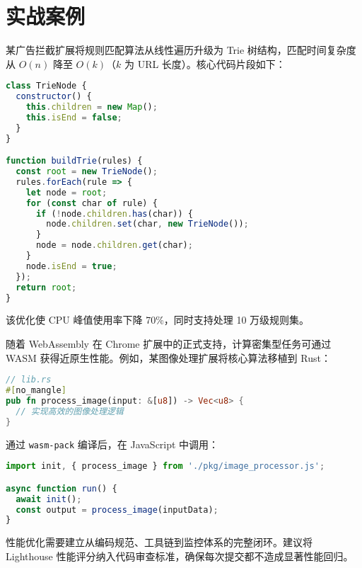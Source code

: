 \chapter{实战案例}
某广告拦截扩展将规则匹配算法从线性遍历升级为 Trie 树结构，匹配时间复杂度从 $O(n)$ 降至 $O(k)$（$k$ 为 URL 长度）。核心代码片段如下：\par
\begin{lstlisting}[language=javascript]
class TrieNode {
  constructor() {
    this.children = new Map();
    this.isEnd = false;
  }
}

function buildTrie(rules) {
  const root = new TrieNode();
  rules.forEach(rule => {
    let node = root;
    for (const char of rule) {
      if (!node.children.has(char)) {
        node.children.set(char, new TrieNode());
      }
      node = node.children.get(char);
    }
    node.isEnd = true;
  });
  return root;
}
\end{lstlisting}
该优化使 CPU 峰值使用率下降 70\%{}，同时支持处理 10 万级规则集。\par
随着 WebAssembly 在 Chrome 扩展中的正式支持，计算密集型任务可通过 WASM 获得近原生性能。例如，某图像处理扩展将核心算法移植到 Rust：\par
\begin{lstlisting}[language=rust]
// lib.rs
#[no_mangle]
pub fn process_image(input: &[u8]) -> Vec<u8> {
  // 实现高效的图像处理逻辑
}
\end{lstlisting}
通过 \verb!wasm-pack! 编译后，在 JavaScript 中调用：\par
\begin{lstlisting}[language=javascript]
import init, { process_image } from './pkg/image_processor.js';

async function run() {
  await init();
  const output = process_image(inputData);
}
\end{lstlisting}
性能优化需要建立从编码规范、工具链到监控体系的完整闭环。建议将 Lighthouse 性能评分纳入代码审查标准，确保每次提交都不造成显著性能回归。\par
